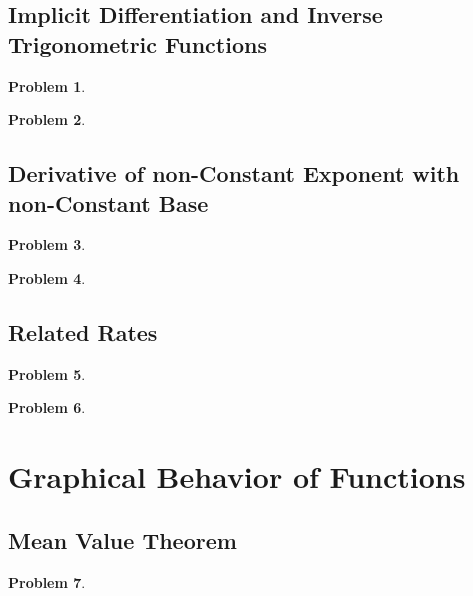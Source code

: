\documentclass{article}
\newtheorem{problem}{Problem}
\begin{document}
\subsection{Implicit Differentiation and Inverse Trigonometric Functions}
\begin{problem}

\end{problem}
\begin{problem}

\end{problem}


\subsection{Derivative of non-Constant Exponent with non-Constant Base}\label{secMPSDerivativeNonConstExponent}
\begin{problem}

\end{problem}


\begin{problem}

\end{problem}

\subsection{Related Rates}\label{secMPSrelatedRates}
\begin{problem}

\end{problem}

\begin{problem}

\end{problem}



\section{Graphical Behavior of Functions}
\subsection{Mean Value Theorem}\label{secMPS-MVT}
\begin{problem}

\end{problem}

\end{document}
